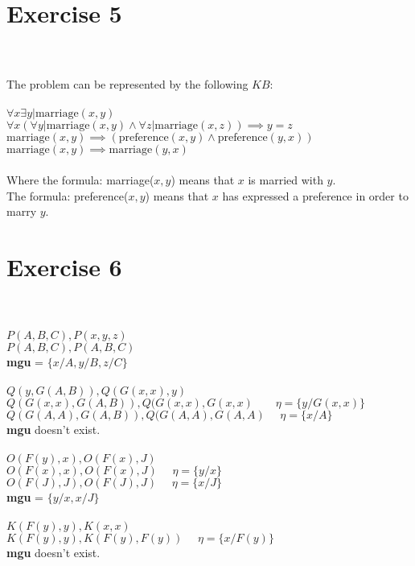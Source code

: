 \documentclass{article}
\begin{document}
\section*{Exercise 5}
\paragraph{}~\\~\\
The problem can be represented by the following $KB$:\\
\\
$\forall x \exists y | \text{marriage}(x,y)$\\
 $\forall x(\forall y| \text{marriage}(x,y)\land \forall z| \text{marriage}(x,z)) \implies y = z$\\
$\text{marriage}(x,y) \implies (\text{preference}(x,y) \land \text{preference}(y,x))$\\
$\text{marriage}(x,y) \implies \text{marriage}(y,x)$\\
\\
Where the formula: marriage($x,y$) means that $x$ is married with $y$.\\
The formula: preference($x,y$) means that $x$ has expressed a preference in order to marry $y$.

\section*{Exercise 6}
\paragraph{}~\\~\\
$P(A,B,C), P(x,y,z)$\\
$P(A,B,C), P(A,B,C)$\\
\textbf{mgu} = $\{x/A, y/B, z/C\}$\\
\\
$Q(y, G(A,B)), Q(G(x,x), y)$\\
$Q(G(x,x), G(A,B)), Q(G(x,x), G(x,x)~~~~~~~~~\eta = \{y/G(x,x)\}$\\
$Q(G(A,A), G(A,B)), Q(G(A,A), G(A,A)~~~~~~\eta = \{x/A\}$\\
\textbf{mgu} doesn't exist.\\
\\
$O(F(y), x), O(F(x), J)$\\
$O(F(x), x), O(F(x), J)~~~~~~\eta = \{y/x\}$\\
$O(F(J), J), O(F(J), J)~~~~~~\eta = \{x/J\}$\\
\textbf{mgu} = $\{y/x, x/J\}$\\
\\
$K(F(y),y), K(x,x)$\\
$K(F(y),y), K(F(y),F(y))~~~~~~\eta = \{x/F(y)\}$\\
\textbf{mgu} doesn't exist.\\
\end{document}
